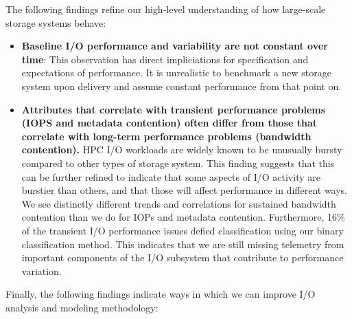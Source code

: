 The following findings refine our high-level understanding of how
large-scale storage systems behave:

\begin{itemize}

\item \textbf{Baseline I/O performance and variability are not constant over
time}: This observation has direct impliciations for specification and
expectations of performance.  It is unrealistic to benchmark a new storage
system upon delivery and assume constant performance from that point on.

\item \textbf{Attributes that correlate with transient performance problems (IOPS
and metadata contention) often differ from those that correlate with
long-term performance problems (bandwidth contention).} HPC I/O workloads
are widely known to be unusually bursty compared to other types of storage
system. This finding suggests that this can be further refined to indicate
that some aspects of I/O activity are burstier than others, and that those
will affect performance in different ways.  We see distinctly different
trends and correlations for sustained bandwidth contention than we do for
IOPs and metadata contention.  Furthermore, 16\% of the transient I/O performance issues defied classification using our binary classification method.
This indicates that we are still missing telemetry from important components of the I/O subsystem that contribute to performance variation. 

\end{itemize}

Finally, the following findings indicate ways in which we can improve
I/O analysis and modeling methodology:

